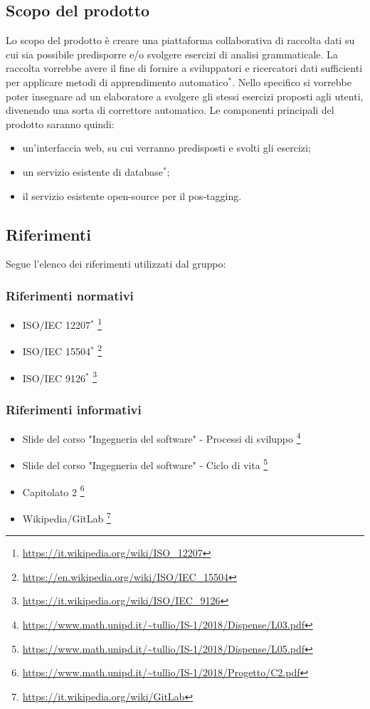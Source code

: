 \documentclass[11pt,a4paper]{article}
\begin{document}
{	\subsection{Scopo del prodotto}
	Lo scopo del prodotto è creare una piattaforma collaborativa di raccolta dati su cui sia possibile predisporre e/o svolgere esercizi di analisi grammaticale. La raccolta vorrebbe avere il fine di fornire a sviluppatori e ricercatori dati sufficienti per applicare metodi di apprendimento automatico$^*$. Nello specifico si vorrebbe poter insegnare ad un elaboratore a svolgere gli stessi esercizi proposti agli utenti, divenendo una sorta di correttore automatico.  
	Le componenti principali del prodotto saranno quindi:
	\begin{itemize}
		\item un'interfaccia web, su cui verranno predisposti e svolti gli esercizi;
		\item un servizio esistente di database$^*$;
		\item il servizio esistente open-source per il pos-tagging.
	\end{itemize}
	
	\subsection{Riferimenti}
	Segue l'elenco dei riferimenti utilizzati dal gruppo:
	\subsubsection{Riferimenti normativi}
	\begin{itemize}
		\item ISO/IEC 12207$^*$
		\footnote{\url {https://it.wikipedia.org/wiki/ISO\_12207}}
		
		\item ISO/IEC 15504$^*$
		\footnote{\url {https://en.wikipedia.org/wiki/ISO/IEC\_15504}}
		\item ISO/IEC 9126$^*$
		\footnote{\url {https://it.wikipedia.org/wiki/ISO/IEC\_9126}}
	\end{itemize}	
	
	\subsubsection{Riferimenti informativi}
	\begin{itemize}
		\item Slide del corso "Ingegneria del software" - Processi di sviluppo 
		\footnote{\url{https://www.math.unipd.it/~tullio/IS-1/2018/Dispense/L03.pdf}}
		\item Slide del corso "Ingegneria del software" - Ciclo di vita 
		\footnote{\url{https://www.math.unipd.it/~tullio/IS-1/2018/Dispense/L05.pdf}}
		\item Capitolato 2
		\footnote{\url{https://www.math.unipd.it/~tullio/IS-1/2018/Progetto/C2.pdf}}
		\item Wikipedia/GitLab
		\footnote{\url {https://it.wikipedia.org/wiki/GitLab}}
	\end{itemize}					
	\newpage
	
}
\end{document}
